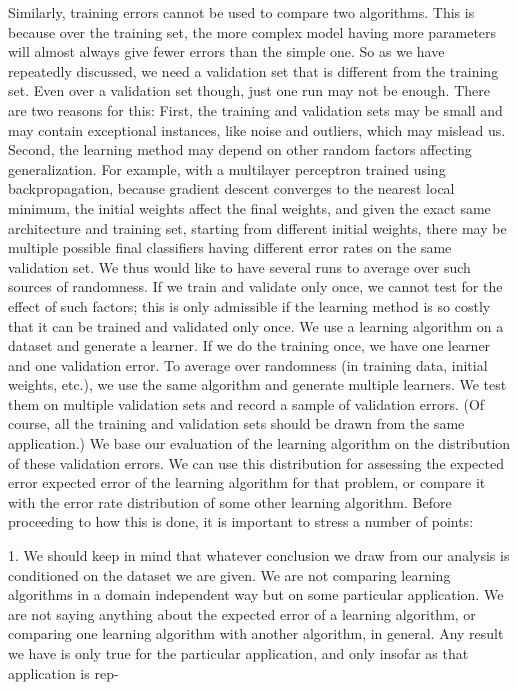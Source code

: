 Similarly, training errors cannot be used to compare two algorithms. This is because over the training set, the more complex model having more parameters will almost always give fewer errors than the simple one. So as we have repeatedly discussed, we need a validation set that is different from the training set. Even over a validation set though, just one run may not be enough. There are two reasons for this: First, the training and validation sets may be small and may contain exceptional instances, like noise and outliers, which may mislead us. Second, the learning method may depend on other random factors affecting generalization. For example, with a multilayer perceptron trained using backpropagation, because gradient descent converges to the nearest local minimum, the initial weights affect the final weights, and given the exact same architecture and training set, starting from different initial weights, there may be multiple possible final classifiers having different error rates on the same validation set. We thus would like to have several runs to average over such sources of randomness. If we train and validate only once, we cannot test for the effect of such factors; this is only admissible if the learning method is so costly that it can be trained and validated only once. We use a learning algorithm on a dataset and generate a learner. If we do the training once, we have one learner and one validation error. To average over randomness (in training data, initial weights, etc.), we use the same algorithm and generate multiple learners. We test them on multiple validation sets and record a sample of validation errors. (Of course, all the training and validation sets should be drawn from the same application.) We base our evaluation of the learning algorithm on the distribution of these validation errors. We can use this distribution for assessing the expected error expected error of the learning algorithm for that problem, or compare it with the error rate distribution of some other learning algorithm. Before proceeding to how this is done, it is important to stress a number of points:

1. We should keep in mind that whatever conclusion we draw from our analysis is conditioned on the dataset we are given. We are not comparing learning algorithms in a domain independent way but on some particular application. We are not saying anything about the expected error of a learning algorithm, or comparing one learning algorithm with another algorithm, in general. Any result we have is only true for the particular application, and only insofar as that application is rep-

